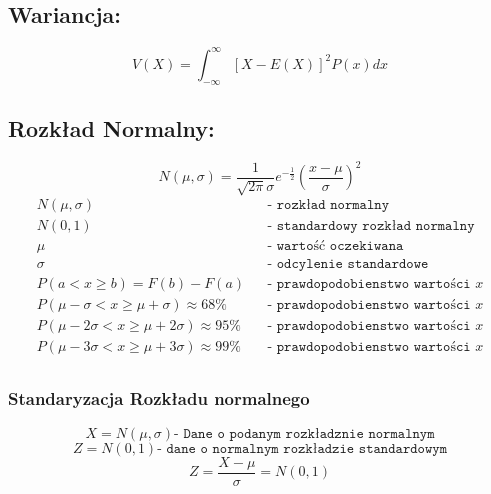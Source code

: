 \documentclass[fleqn]{article}
\begin{document}
\subsection{Wariancja:}
\[V(X)=\int_{-\infty}^{\infty}\left[X-E(X)\right]^2P(x)dx\]



\subsection{Rozkład Normalny:}
\[N(\mu,\sigma) =  \frac{1}{\sqrt{2\pi}\sigma}e^{-\frac{1}{2}} \left( \frac{x- \mu}{\sigma} \right)^2 \]
\begin{align*}
N(\mu,\sigma)&&\texttt{- rozkład normalny}\\
N(0,1)& &\texttt{- standardowy rozkład normalny}\\
\mu& &\texttt{- wartość oczekiwana}\\
\sigma& &\texttt{- odcylenie standardowe}\\
P(a < x \geq b) = F(b)-F(a)& &\texttt{- prawdopodobienstwo wartości }x\\
P(\mu -\sigma < x \geq \mu+\sigma) \approx 68\%& &\texttt{- prawdopodobienstwo wartości }x  \\
P(\mu -2\sigma < x \geq \mu+2\sigma) \approx 95\%& &\texttt{- prawdopodobienstwo wartości }x \\
P(\mu -3\sigma < x \geq \mu+3\sigma) \approx 99\%& &\texttt{- prawdopodobienstwo wartości }x \\
\end{align*}

\subsubsection{Standaryzacja Rozkładu normalnego}
\[X = N(\mu,\sigma) \texttt{- Dane o podanym rozkładznie normalnym}\]
\[Z = N(0,1) \texttt{- dane o normalnym rozkładzie standardowym}\]
\[Z = \frac{X-\mu}{\sigma} = N(0,1) \]
\end{document}

